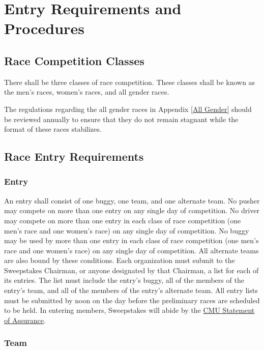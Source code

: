 \chapter{Entry Requirements and Procedures}

\section{Race Competition Classes}

	There shall be three classes of race competition. These classes shall be known as the men's races, women's races, and all gender races. 

    The regulations regarding the all gender races in Appendix \ref*{All Gender} should be reviewed annually to ensure that they do not remain stagnant while the format of these races stabilizes.


\section{Race Entry Requirements}

\subsection{Entry}

An entry shall consist of one buggy, one team, and one alternate team. No pusher may compete on more than one entry on any single day of competition. No driver may compete on more than one entry in each class of race competition (one men's race and one women's race) on any single day of competition. No buggy may be used by more than one entry in each class of race competition (one men's race and one women's race) on any single day of competition. All alternate teams are also bound by these conditions. Each organization must submit to the Sweepstakes Chairman, or anyone designated by that Chairman, a list for each of its entries. The list must include the entry's buggy, all of the members of the entry's team, and all of the members of the entry's alternate team. All entry lists must be submitted by noon on the day before the preliminary races are scheduled to be held. In entering members, Sweepstakes will abide by the \href{http://www.cmu.edu/policies/documents/SoA.html}{CMU Statement of Assurance}.

\subsection{Team}


